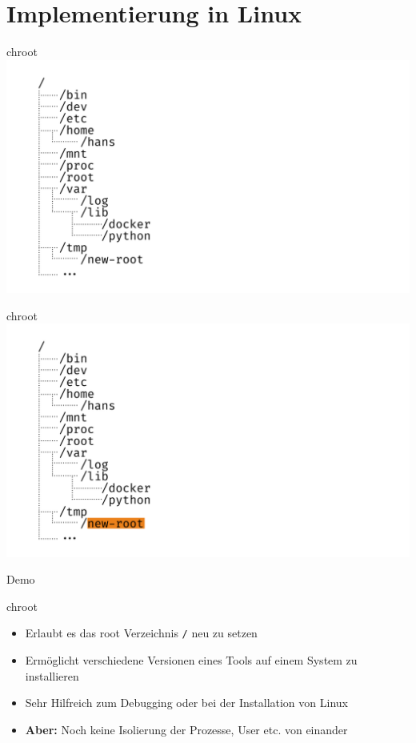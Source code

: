 \documentclass{beamer}
\begin{document}
  \section{Implementierung in Linux}
  \begin{frame}{chroot}
    \includegraphics[width=\textwidth]{fs-tree}
  \end{frame}
  \begin{frame}{chroot}
    \includegraphics[width=\textwidth]{fs-tree-highlight}
  \end{frame}
  \begin{frame}[standout]
    Demo
  \end{frame}
  \begin{frame}{chroot}
    \begin{itemize}
      \item Erlaubt es das root Verzeichnis \texttt{/} neu zu setzen
      \item Ermöglicht verschiedene Versionen eines Tools auf einem System zu installieren
      \item Sehr Hilfreich zum Debugging oder bei der Installation von Linux
      \item \textbf{Aber:} Noch keine Isolierung der Prozesse, User etc. von einander
    \end{itemize}
  \end{frame}
  
\end{document}
